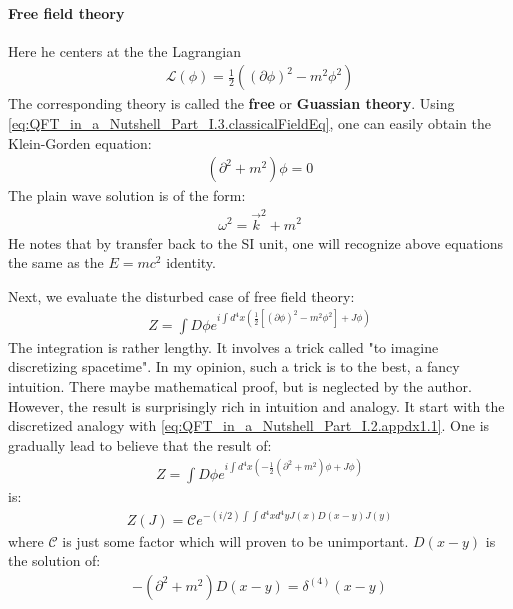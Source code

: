 \documentclass{book}
\numberwithin{equation}{subsection} %
\theoremstyle{definition}
\begin{document}
\paragraph{Free field theory}

Here he centers at the the Lagrangian
\begin{align}
    \mathcal{L}(\phi)=\frac{1}{2}\left( (\partial\phi)^2-m^2\phi^2\right)
\end{align}
The corresponding theory is called the \textbf{free} or 
\textbf{Guassian theory}. Using 
\ref{eq:QFT_in_a_Nutshell_Part_I.3.classicalFieldEq}, one can easily
obtain the Klein-Gorden equation:
\begin{align}
    (\partial^2+m^2)\phi=0
\end{align}
The plain wave solution is of the form:
\begin{align}
    \omega^2=\vec{k}^2+m^2
\end{align}
He notes that by transfer back to the SI unit, one will
recognize above equations the same as the $E=mc^2$ identity.

Next, we evaluate the disturbed case of free field theory:
\begin{align}
    Z = \int D\phi e^{i\int d^4x \left( \frac{1}{2} 
        [(\partial\phi)^2-m^2\phi^2]+J\phi \right)
        }
\end{align}
The integration is rather lengthy. It involves a trick called
"to imagine discretizing spacetime". In my opinion, such a trick
is to the best, a fancy intuition. There maybe mathematical proof,
but is neglected by the author. However, the result is surprisingly
rich in intuition and analogy. It start with the discretized
analogy with \eqref{eq:QFT_in_a_Nutshell_Part_I.2.appdx1.1}. One
is gradually lead to believe that the result of:
\begin{align}
    Z = \int D\phi e^{ i\int d^4x 
        \left(-\frac{1}{2}(\partial^2+m^2)\phi+J\phi \right)}
\end{align}
is:
\begin{align}
    \label{eq:QFT_in_a_Nutshell_Part_I.3.3}
    Z(J) = \mathcal{C}e^{-(i/2) \int\int d^4xd^4y J(x)D(x-y)J(y)}
\end{align}
where $\mathcal{C}$ is just some factor which will proven to be
unimportant. $D(x-y)$ is the solution of:
\begin{align}
    \label{eq:QFT_in_a_Nutshell_Part_I.3.2}
    -(\partial^2+m^2)D(x-y)=\delta^{(4)}(x-y)
\end{align}
\end{document}
